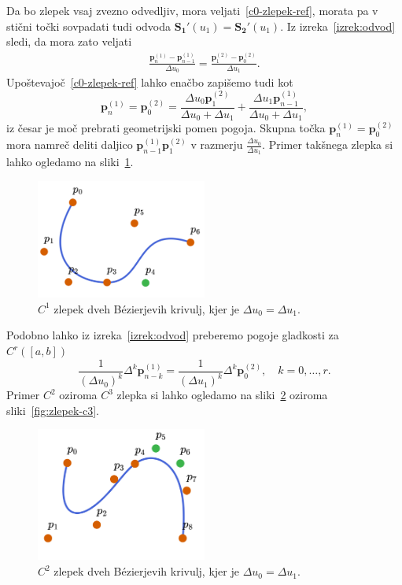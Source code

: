\documentclass[isrm2, tisk]{fmfdelo}
\newcommand{\p}{\mathbf{p}}
\begin{document}
    \noindent Da bo zlepek vsaj zvezno odvedljiv, mora veljati~\eqref{c0-zlepek-ref}, morata pa v stični točki sovpadati tudi odvoda $\mathbf{S_1}'(u_1) = \mathbf{S_2}'(u_1)$.
    Iz izreka~\ref{izrek:odvod} sledi, da mora zato veljati
    \begin{align}
        \frac{\p_{n}^{(1)} - \p_{n-1}^{(1)}}{\Delta u_0} = \frac{\p_{1}^{(2)} - \p_{0}^{(2)}}{\Delta u_1}.
    \end{align}
    Upoštevajoč~\eqref{c0-zlepek-ref} lahko enačbo zapišemo tudi kot
    $$\p_{n}^{(1)} =  \p_{0}^{(2)}  = \frac{\Delta u_0\p_{1}^{(2)}}{\Delta u_0+\Delta u_1} + \frac{\Delta u_1\p_{n-1}^{(1)}}{\Delta u_0+\Delta u_1} ,$$
    iz česar je moč prebrati geometrijski pomen pogoja.
    Skupna točka $\p_{n}^{(1)} =  \p_{0}^{(2)}$ mora namreč deliti daljico $\p_{n-1}^{(1)}\p_{1}^{(2)}$ v razmerju $\frac{\Delta u_0}{\Delta u_1}$.
    Primer takšnega zlepka si lahko ogledamo na sliki~\ref{fig:zlepek-c1}.
    \begin{figure}[h]
        \centering
        \includegraphics[width = 0.50\textwidth]{images/zlepek-c1}
        \caption{$C^1$ zlepek dveh Bézierjevih krivulj, kjer je $\Delta u_0=\Delta u_1$.}
        \label{fig:zlepek-c1}
    \end{figure}
    Podobno lahko iz izreka~\ref{izrek:odvod} preberemo pogoje gladkosti za $C^r([a,b])$
    $$ \frac{1}{(\Delta u_0)^k}\Delta^k\p^{(1)}_{n-k}= \frac{1}{(\Delta u_1)^k}\Delta^k\p^{(2)}_{0}, \quad k=0,\dots,r.$$
    Primer $C^2$ oziroma $C^3$ zlepka si lahko ogledamo na sliki~\ref{fig:zlepek-c2} oziroma sliki~\ref{fig:zlepek-c3}.
    \begin{figure}[h]
        \centering
        \includegraphics[width = 0.50\textwidth]{images/zlepek-c2}
        \caption{$C^2$ zlepek dveh Bézierjevih krivulj, kjer je $\Delta u_0=\Delta u_1$.}
        \label{fig:zlepek-c2}
    \end{figure}
\end{document}
